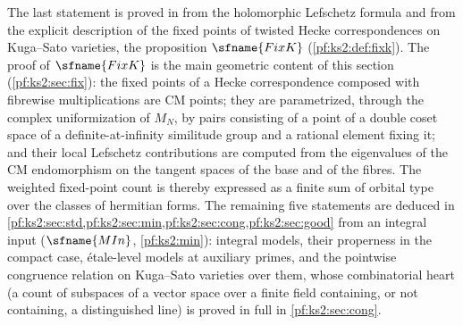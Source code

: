 The last statement is proved in 
from the holomorphic Lefschetz formula and from the explicit description of the fixed points of
twisted Hecke correspondences on Kuga--Sato varieties, the proposition $\sfname{FixK}$
(\cref{pf:ks2:def:fixk}). The proof of $\sfname{FixK}$ is the main geometric content of this
section (\cref{pf:ks2:sec:fix}): the fixed points of a Hecke correspondence composed with fibrewise
multiplications are CM points; they are parametrized, through the complex uniformization of $M_N$,
by pairs consisting of a point of a double coset space of a definite-at-infinity similitude group
and a rational element fixing it; and their local Lefschetz contributions are computed from the
eigenvalues of the CM endomorphism on the tangent spaces of the base and of the fibres. The
weighted fixed-point count is thereby expressed as a finite sum of orbital type over the classes of
hermitian forms. The remaining five statements are deduced in
\cref{pf:ks2:sec:std,pf:ks2:sec:min,pf:ks2:sec:cong,pf:ks2:sec:good} from an integral input
($\sfname{MIn}$, \cref{pf:ks2:min}): integral models, their properness in the compact case,
\'etale-level models at auxiliary primes, and the pointwise congruence relation on Kuga--Sato
varieties over them, whose combinatorial heart (a count of subspaces of a vector space over a
finite field containing, or not containing, a distinguished line) is proved in full in
\cref{pf:ks2:sec:cong}.

